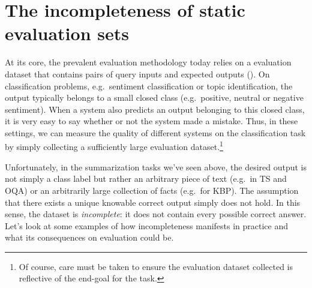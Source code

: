 \section{The incompleteness of static evaluation sets}
At its core, the prevalent evaluation methodology today relies on a evaluation dataset that contains pairs of query inputs and expected outputs ().
On classification problems, e.g.\ sentiment classification or topic identification, the output typically belongs to a small closed class (e.g.\ positive, neutral or negative sentiment).
When a system also predicts an output belonging to this closed class, it is very easy to say whether or not the system made a mistake.
Thus, in these settings, we can measure the quality of different systems on the classification task by simply collecting a sufficiently large evaluation dataset.\footnote{%
Of course, care must be taken to ensure the evaluation dataset collected is reflective of the end-goal for the task.}

Unfortunately, in the summarization tasks we've seen above, the desired output is not simply a class label but rather an arbitrary piece of text (e.g.\ in TS and OQA) or an arbitrarily large collection of facts (e.g.\ for KBP).
The assumption that there exists a unique knowable correct output simply does not hold.
In this sense, the dataset is \textit{incomplete}: it does not contain every possible correct answer.
Let's look at some examples of how incompleteness manifests in practice and what its consequences on evaluation could be.

